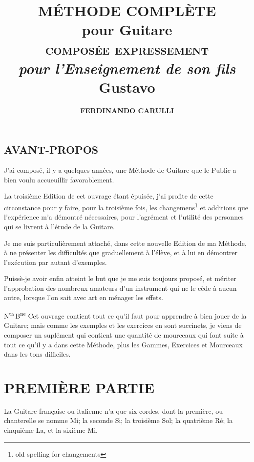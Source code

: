 \documentclass[a4paper]{book}
\title{%
  \Huge\textbf{MÉTHODE COMPLÈTE}\\
  pour Guitare\\
  \LARGE\textsc{composée expressement}\\
  \textit{pour l'Enseignement de son fils}\\
  \huge\textbf{Gustavo}}
\author{\Huge\bfseries FERDINANDO CARULLI}
\date{}
\begin{document}
\frontmatter

\maketitle
\thispagestyle{empty}
\cleardoublepage

\mainmatter

\chapter*{AVANT-PROPOS}

J'ai composé, il y a quelques années, une Méthode de Guitare que le Public a bien voulu accueuillir favorablement.

La troisième Edition de cet ouvrage étant épuisée, j'ai profite de cette circonstance pour y faire, pour la troisième fois, les changemens\footnote{old spelling for changements} et additions que l'expérience m'a démontré nécessaires, pour l'agrément et l'utilité des personnes qui se livrent à l'étude de la Guitare.

Je me suis particulièrement attaché, dans cette nouvelle Edition de ma Méthode, à ne présenter les difficultés que graduellement à l'élève, et à lui en démontrer l'exécution par autant d'exemples.

Puissè-je avoir enfin atteint le but que je me suis toujours proposé, et mériter l'approbation des nombreux amateurs d'un instrument qui ne le cède à aucun autre, lorsque l'on sait avec art en ménager les effets.

N\textsuperscript{ta}\,B\textsuperscript{ne}
Cet ouvrage contient tout ce qu'il faut pour apprendre à bien jouer de la Guitare; mais comme les exemples et les exercices en sont succinets, je viens de composer un suplément qui contient une quantité de mourceaux qui font suite à tout ce qu'il y a dans cette Méthode, plus les Gammes, Exercices et Mourceaux dans les tons difficiles.
\clearpage

{
  \let\cleardoublepage\clearpage
  \renewcommand{\contentsname}{Cette Méthode est divisée en trois Parties}
  \tableofcontents
}

\part{PREMIÈRE PARTIE}

La Guitare française ou italienne n'a que six cordes, dont la première, ou chanterelle se nomme Mi; la seconde Si; la troisième Sol; la quatrième Ré; la cinquième La, et la sixième Mi.
\end{document}
